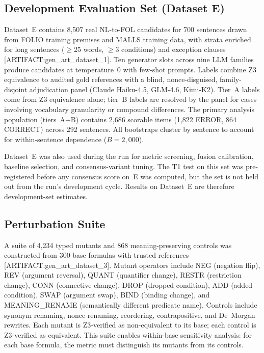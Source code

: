 \documentclass[11pt,letterpaper]{article}
\begin{document}
\subsection{Development Evaluation Set (Dataset E)}
\label{sec:dataset_e}

Dataset~E contains 8,507 real NL-to-FOL candidates for 700 sentences drawn from FOLIO training premises and MALLS training data, with strata enriched for long sentences ($\geq$25 words, $\geq$3 conditions) and exception clauses [ARTIFACT:gen\_art\_dataset\_1].
Ten generator slots across nine LLM families produce candidates at temperature~0 with few-shot prompts.
Labels combine Z3 equivalence to audited gold references with a blind, nonce-disguised, family-disjoint adjudication panel (Claude Haiku-4.5, GLM-4.6, Kimi-K2).
Tier~A labels come from Z3 equivalence alone; tier~B labels are resolved by the panel for cases involving vocabulary granularity or compound differences.
The primary analysis population (tiers~A+B) contains 2,686 scorable items (1,822 ERROR, 864 CORRECT) across 292 sentences.
All bootstraps cluster by sentence to account for within-sentence dependence ($B = 2{,}000$).

Dataset~E was also used during the run for metric screening, fusion calibration, baseline selection, and consensus-variant tuning.
The T1 test on this set was pre-registered before any consensus score on~E was computed, but the set is not held out from the run's development cycle.
Results on Dataset~E are therefore development-set estimates.

\subsection{Perturbation Suite}
\label{sec:perturb_suite}

A suite of 4,234 typed mutants and 868 meaning-preserving controls was constructed from 300 base formulas with trusted references [ARTIFACT:gen\_art\_dataset\_3].
Mutant operators include NEG (negation flip), REV (argument reversal), QUANT (quantifier change), RESTR (restriction change), CONN (connective change), DROP (dropped condition), ADD (added condition), SWAP (argument swap), BIND (binding change), and MEANING\_RENAME (semantically different predicate name).
Controls include synonym renaming, nonce renaming, reordering, contrapositive, and De~Morgan rewrites.
Each mutant is Z3-verified as non-equivalent to its base; each control is Z3-verified as equivalent.
This suite enables within-base sensitivity analysis: for each base formula, the metric must distinguish its mutants from its controls.
\end{document}
